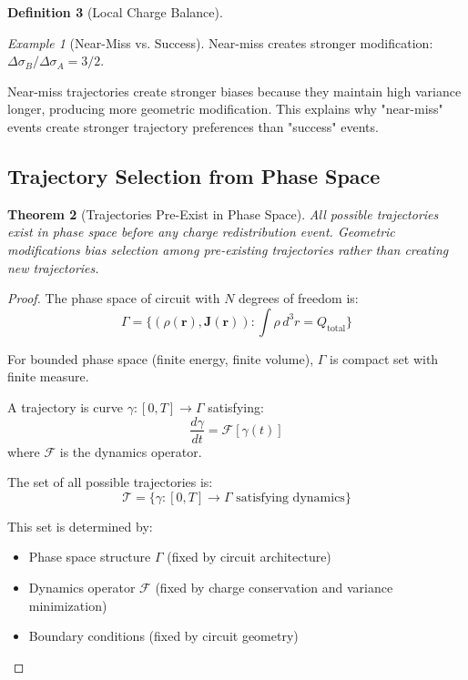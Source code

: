 \documentclass[12pt,a4paper]{article}
\theoremstyle{plain}
\newtheorem{theorem}{Theorem}[section]
\theoremstyle{definition}
\newtheorem{definition}[theorem]{Definition}
\theoremstyle{remark}
\newtheorem{example}[theorem]{Example}
\begin{document}
\begin{definition}[Local Charge Balance]
\begin{example}[Near-Miss vs. Success]
Near-miss creates stronger modification: $\Delta \sigma_B / \Delta \sigma_A = 3/2$.

Near-miss trajectories create stronger biases because they maintain high variance longer, producing more geometric modification. This explains why "near-miss" events create stronger trajectory preferences than "success" events.
\end{example}

\subsection{Trajectory Selection from Phase Space}

\begin{theorem}[Trajectories Pre-Exist in Phase Space]
\label{thm:trajectories_preexist}
All possible trajectories exist in phase space before any charge redistribution event. Geometric modifications bias selection among pre-existing trajectories rather than creating new trajectories.
\end{theorem}

\begin{proof}
The phase space of circuit with $N$ degrees of freedom is:
\begin{equation}
\Gamma = \{(\rho(\mathbf{r}), \mathbf{J}(\mathbf{r})) : \int \rho \, d^3r = Q_{\text{total}}\}
\end{equation}

For bounded phase space (finite energy, finite volume), $\Gamma$ is compact set with finite measure.

A trajectory is curve $\gamma: [0,T] \to \Gamma$ satisfying:
\begin{equation}
\frac{d\gamma}{dt} = \mathcal{F}[\gamma(t)]
\end{equation}
where $\mathcal{F}$ is the dynamics operator.

The set of all possible trajectories is:
\begin{equation}
\mathcal{T} = \{\gamma : [0,T] \to \Gamma \text{ satisfying dynamics}\}
\end{equation}

This set is determined by:
\begin{itemize}
\item Phase space structure $\Gamma$ (fixed by circuit architecture)
\item Dynamics operator $\mathcal{F}$ (fixed by charge conservation and variance minimization)
\item Boundary conditions (fixed by circuit geometry)
\end{itemize}


\end{proof}
\end{definition}
\end{document}
